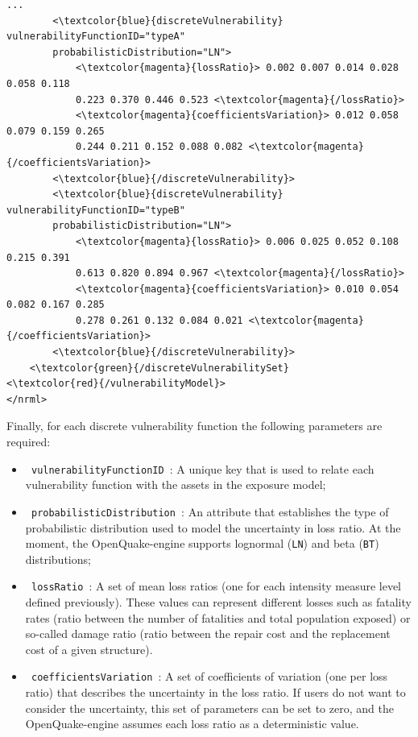 \begin{Verbatim}[frame=single, commandchars=\\\{\}, samepage=true]
        ...
        <\textcolor{blue}{discreteVulnerability}  vulnerabilityFunctionID="typeA" 
        probabilisticDistribution="LN">
            <\textcolor{magenta}{lossRatio}> 0.002 0.007 0.014 0.028 0.058 0.118
            0.223 0.370 0.446 0.523 <\textcolor{magenta}{/lossRatio}>
            <\textcolor{magenta}{coefficientsVariation}> 0.012 0.058 0.079 0.159 0.265
            0.244 0.211 0.152 0.088 0.082 <\textcolor{magenta}{/coefficientsVariation}>
        <\textcolor{blue}{/discreteVulnerability}>
        <\textcolor{blue}{discreteVulnerability}  vulnerabilityFunctionID="typeB"
        probabilisticDistribution="LN">
            <\textcolor{magenta}{lossRatio}> 0.006 0.025 0.052 0.108 0.215 0.391
            0.613 0.820 0.894 0.967 <\textcolor{magenta}{/lossRatio}>
            <\textcolor{magenta}{coefficientsVariation}> 0.010 0.054 0.082 0.167 0.285
            0.278 0.261 0.132 0.084 0.021 <\textcolor{magenta}{/coefficientsVariation}>
        <\textcolor{blue}{/discreteVulnerability}>
    <\textcolor{green}{/discreteVulnerabilitySet}
<\textcolor{red}{/vulnerabilityModel}>
</nrml>
\end{Verbatim}

Finally, for each discrete \gls{vulnerability function} the following parameters are required:
\begin{itemize}
\item  \Verb+ vulnerabilityFunctionID +: A unique key that is used to relate each \gls{vulnerability function} with the \glspl{asset} in the \gls{exposure model};
\item  \Verb+ probabilisticDistribution +: An attribute that establishes the type of probabilistic distribution used to model the uncertainty in loss ratio. At the moment, the OpenQuake-engine supports lognormal (\Verb+LN+) and beta (\Verb+BT+) distributions;
\item  \Verb+ lossRatio +: A set of mean loss ratios (one for each intensity measure level defined previously). These values can represent different losses such as fatality rates (ratio between the number of fatalities and total population exposed) or so-called damage ratio (ratio between the repair cost and the replacement cost of a given structure).
\item  \Verb+ coefficientsVariation +: A set of coefficients of variation (one per loss ratio) that describes the uncertainty in the loss ratio. If users do not want to consider the uncertainty, this set of parameters can be set to zero, and the OpenQuake-engine assumes each loss ratio as a deterministic value.
\end{itemize}

